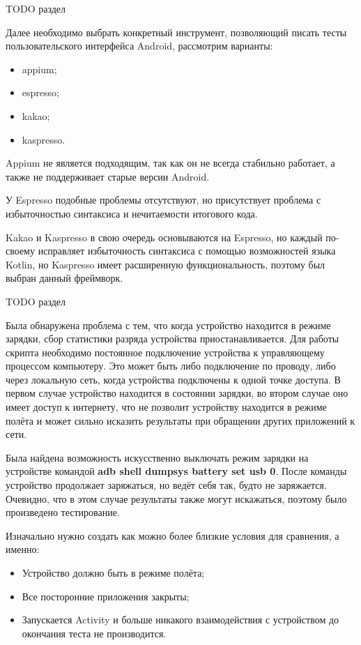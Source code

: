 \documentclass[a4paper,14pt]{extarticle} %
\begin{document}
	{\huge TODO раздел}
	
	Далее необходимо выбрать конкретный инструмент, позволяющий писать тесты пользовательского интерфейса Android, рассмотрим варианты:
	\begin{itemize}
		\item appium;
		\item espresso;
		\item kakao;
		\item kaspresso.
	\end{itemize}
	
	Appium не является подходящим, так как он не всегда стабильно работает, а также не поддерживает старые версии Android. 
	
	У Espresso подобные проблемы отсутствуют, но присутствует проблема с избыточностью синтаксиса и нечитаемости итогового кода. 
	
	Kakao и Kaspresso в свою очередь основываются на Espresso, но каждый по-своему исправляет избыточность синтаксиса с помощью возможностей языка Kotlin, но Kaspresso имеет расширенную функциональность, поэтому был выбран данный фреймворк.
	
	{\huge TODO раздел}
	
	Была обнаружена проблема с тем, что когда устройство находится в режиме зарядки, сбор статистики разряда устройства приостанавливается. Для работы скрипта необходимо постоянное подключение устройства к управляющему процессом компьютеру. Это может быть либо подключение по проводу, либо через локальную сеть, когда устройства подключены к одной точке доступа. В первом случае устройство находится в состоянии зарядки, во втором случае оно имеет доступ к интернету, что не позволит устройству находится в режиме полёта и может сильно исказить результаты при обращении других приложений к сети.
	
	Была найдена возможность искусственно выключать режим зарядки на устройстве командой \textbf{adb shell dumpsys battery set usb 0}. После команды устройство продолжает заряжаться, но ведёт себя так, будто не заряжается. Очевидно, что в этом случае результаты также могут искажаться, поэтому было произведено тестирование.
	
	Изначально нужно создать как можно более близкие условия для сравнения, а именно:
	\begin{itemize}
		\item Устройство должно быть в режиме полёта;
		\item Все посторонние приложения закрыты;
		\item Запускается Activity и больше никакого взаимодействия с устройством до окончания теста не производится.
	\end{itemize}
\end{document}
